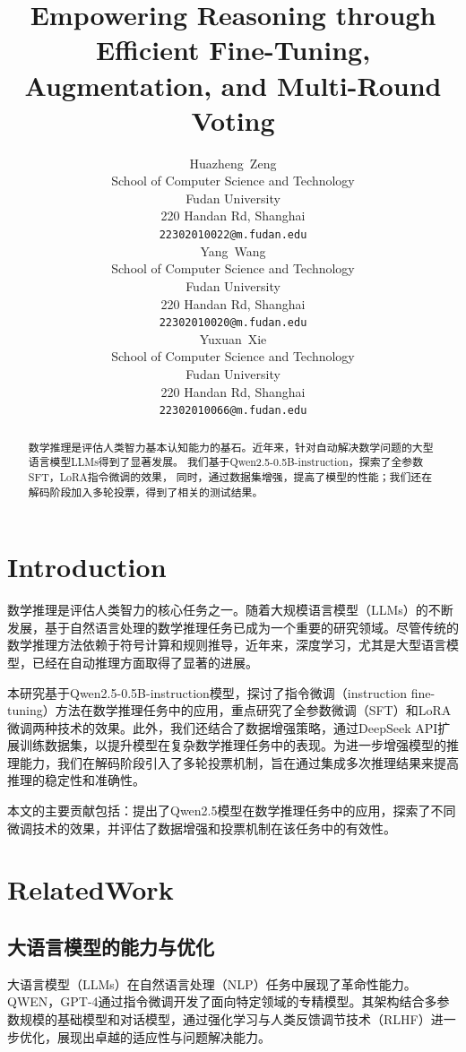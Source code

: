 \documentclass{article}
\title{Empowering Reasoning through Efficient Fine-Tuning, Augmentation, and Multi-Round Voting}
\author{
    Huazheng~Zeng\\
    School of Computer Science and Technology \\
    Fudan University \\
    220 Handan Rd, Shanghai \\
    \texttt{22302010022@m.fudan.edu} \\
    \AND
    Yang~Wang\\
    School of Computer Science and Technology \\
    Fudan University \\
    220 Handan Rd, Shanghai \\
    \texttt{22302010020@m.fudan.edu} \\
    \AND
    Yuxuan~Xie\\
    School of Computer Science and Technology \\
    Fudan University \\
    220 Handan Rd, Shanghai \\
    \texttt{22302010066@m.fudan.edu} \\
}
\begin{document}
\maketitle


\begin{abstract}
  数学推理是评估人类智力基本认知能力的基石。近年来，针对自动解决数学问题的大型语言模型LLMs得到了显著发展。
  我们基于Qwen2.5-0.5B-instruction，探索了全参数SFT，LoRA指令微调的效果，
  同时，通过数据集增强，提高了模型的性能；我们还在解码阶段加入多轮投票，得到了相关的测试结果。
\end{abstract}



\section{Introduction}

数学推理是评估人类智力的核心任务之一。随着大规模语言模型（LLMs）的不断发展，基于自然语言处理的数学推理任务已成为一个重要的研究领域。尽管传统的数学推理方法依赖于符号计算和规则推导，近年来，深度学习，尤其是大型语言模型，已经在自动推理方面取得了显著的进展。

本研究基于Qwen2.5-0.5B-instruction模型，探讨了指令微调（instruction fine-tuning）方法在数学推理任务中的应用，重点研究了全参数微调（SFT）和LoRA微调两种技术的效果。此外，我们还结合了数据增强策略，通过DeepSeek API扩展训练数据集，以提升模型在复杂数学推理任务中的表现。为进一步增强模型的推理能力，我们在解码阶段引入了多轮投票机制，旨在通过集成多次推理结果来提高推理的稳定性和准确性。

本文的主要贡献包括：提出了Qwen2.5模型在数学推理任务中的应用，探索了不同微调技术的效果，并评估了数据增强和投票机制在该任务中的有效性。







\section{RelatedWork}

\subsection{大语言模型的能力与优化}
大语言模型（LLMs）在自然语言处理（NLP）任务中展现了革命性能力。QWEN\cite{bai2023qwentech}，GPT-4通过指令微调开发了面向特定领域的专精模型。其架构结合多参数规模的基础模型和对话模型，通过强化学习与人类反馈调节技术（RLHF）进一步优化，展现出卓越的适应性与问题解决能力\cite{bai2023qwentech}\cite{openai2024gpt4}。
\end{document}

